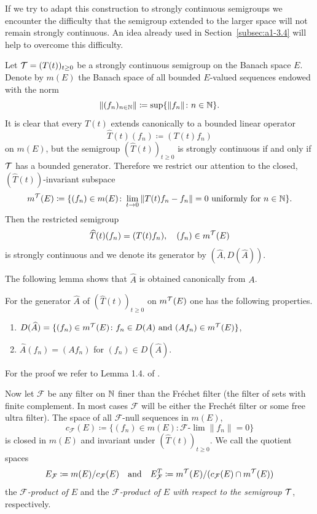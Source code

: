 If we try to adapt this construction to strongly continuous semigroups we encounter the difficulty that the semigroup extended to the larger space will not remain strongly continuous.
An idea already used in Section~\ref{subsec:a1-3.4} will help to overcome this difficulty.

Let $\TT = (T(t))_{t \geq 0}$ be a strongly continuous semigroup on the Banach space $E$.
Denote by $m(E)$ the Banach space of all bounded $E$-valued sequences endowed with the norm
\[
    \|(f_{n})_{n \in \mathbb{N}}\| \coloneq \sup \{\|f_{n}\| \colon n \in \mathbb{N}\} .
\]
It is clear that every $T(t)$ extends canonically to a bounded linear operator
\[
    \widehat{T}(t)(f_{n}) \coloneq (T(t)f_{n})
\]
on $m(E)$, but the semigroup $(\widehat{T}(t))_{t \geq 0}$ is strongly continuous if and only if\/ $\mathcal{T}$ has a bounded generator.
Therefore we restrict our attention to the closed, $(\widehat{T}(t))$-invariant subspace
\[
    m^{\mathcal{T}}(E) \coloneq \{(f_{n}) \in m(E) \colon \lim_{t \to 0} \|T(t)f_{n}-f_{n}\| = 0 \text{ uniformly for } n \in \mathbb{N}\} .
\]
Then the restricted semigroup
\[
    \widehat{T}(t)(f_{n}) = (T(t)f_{n}), \quad (f_{n}) \in m^{\mathcal{T}}(E)
\]
is strongly continuous and we denote its generator by $(\widehat{A},D(\widehat{A}))$.

The following lemma shows that $\widehat{A}$ is obtained canonically from $A$.
\begin{lemma*}\label{lem:a1-3.6}
For the generator $\widehat{A}$ of\/ $(\widehat{T}(t))_{t \geq 0}$ on $m^{\mathcal{T}}(E)$ one has the following properties.
\begin{enumerate}[\upshape(i)]

\item 
$D(\widehat{A}) = \{(f_{n}) \in m^{\mathcal{T}}(E) \colon f_{n} \in D(A) \text{ and } (Af_{n}) \in m^{\mathcal{T}}(E)\}$,

\item 
$\widehat{A}(f_{n}) = (Af_{n})$ for $(f_{n}) \in D(\widehat{A})$.
\end{enumerate}
\end{lemma*}
For the proof we refer to Lemma 1.4. of \textcite{derndinger:1980}.

Now let $\mathcal{F}$ be any filter on $\mathbb{N}$ finer than the Fréchet filter (\ie the filter of sets with finite complement. In most cases $\mathcal{F}$ will be either the Frechét filter or some free ultra filter).
The space of all $\mathcal{F}$-null sequences in $m(E)$, \ie
\[
    c_{\mathcal{F}}(E) \coloneq \{(f_{n}) \in m(E) \colon \mathcal{F}\text{-}\lim\|f_{n}\| = 0\}
\]
is closed in $m(E)$ and invariant under $(\widehat{T}(t))_{t \geq 0}$. 
We call the quotient spaces
\[
    E_{\mathcal{F}} \coloneq m(E)/c_{\mathcal{F}}(E) 
    \quad \text{and} \quad 
    E_{\mathcal{F}}^{T} \coloneq m^{\mathcal{T}}(E)/ (c_{\mathcal{F}}(E)\cap m^{\mathcal{T}}(E))
\]
the \emph{$\mathcal{F}$-product of\/ $E$} and the \emph{$ \mathcal{F} $-product of\/ $E$ with respect to the semigroup $\mathcal{T}$}, respectively.

